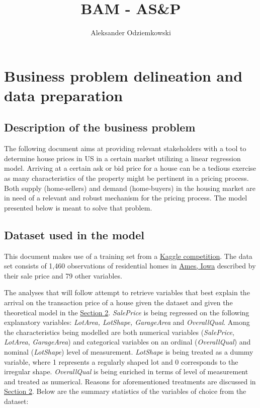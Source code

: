 \documentclass{article}
\title{BAM - AS\&P}
\author{Aleksander Odziemkowski}
\begin{document}
\maketitle

\begin{abstract}
\centering
\end{abstract}

\section{Business problem delineation and data preparation}

\subsection{Description of the business problem}

The following document aims at providing relevant stakeholders with a tool to determine house prices in US in a certain market utilizing a linear regression model. Arriving at a certain ask or bid price for a house can be a tedious exercise as many characteristics of the property might be pertinent in a pricing process. Both supply (home-sellers) and demand (home-buyers) in the housing market are in need of a relevant and robust mechanism for the pricing process. The model presented below is meant to solve that problem.

\subsection{Dataset used in the model}

This document makes use of a training set from a \href{https://www.kaggle.com/c/home-data-for-ml-course/data?select=train.csv}{Kaggle competition}. The data set consists of 1,460 observations of residential homes in \href{https://www.google.com/maps/place/Ames,+IA,+USA/@42.0258192,-93.6964165,12z/data=!4m13!1m7!3m6!1s0x87ee70624634a06b:0x273156083cc75200!2sAmes,+IA,+USA!3b1!8m2!3d42.0307812!4d-93.6319131!3m4!1s0x87ee70624634a06b:0x273156083cc75200!8m2!3d42.0307812!4d-93.6319131}{Ames, Iowa} described by their sale price and 79 other variables. 

The analyses that will follow attempt to retrieve variables that best explain the arrival on the transaction price of a house given the dataset and given the theoretical model in the \hyperref[sec:theory]{Section 2}. \emph{SalePrice} is being regressed on the following explanatory variables: \emph{LotArea, LotShape, GarageArea} and \emph{OverallQual}. Among the characteristics being modelled are both numerical variables (\emph{SalePrice}, \emph{LotArea}, \emph{GarageArea}) and categorical variables on an ordinal (\emph{OverallQual}) and nominal (\emph{LotShape}) level of measurement. \emph{LotShape} is being treated as a dummy variable, where 1 represents a regularly shaped lot and 0 corresponds to the irregular shape. \emph{OverallQual} is being enriched in terms of level of measurement and treated as numerical. Reasons for aforementioned treatments are discussed in \hyperref[sec:theory]{Section 2}. Below are the summary statistics of the variables of choice from the dataset:
\end{document}
